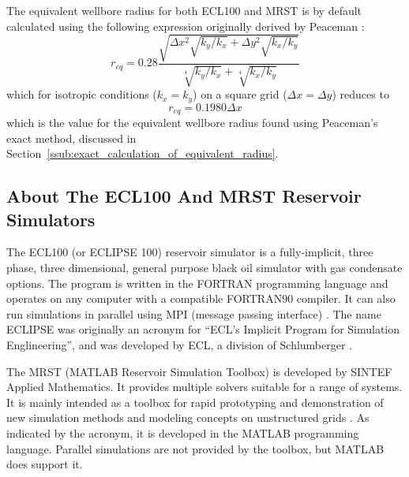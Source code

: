 The equivalent wellbore radius for both ECL100 and MRST is by default calculated using the following expression \cite{Schlumberger2013Eclipse,Lie2014Introduction} originally derived by Peaceman \cite{Peaceman1983Interpretation}:
\begin{equation}
    r_{eq} = 0.28 \frac{\sqrt{\Delta x^2 \sqrt{k_y/k_x} + \Delta y^2 \sqrt{k_x/k_y}}}{\sqrt[4]{k_y/k_x}+\sqrt[4]{k_x/k_y}}
\end{equation}
which for isotropic conditions ($k_x=k_y$) on a square grid ($\Delta x= \Delta y$) reduces to
\begin{equation}
    r_{eq} = 0.1980 \Delta x
\end{equation}
which is the value for the equivalent wellbore radius found using Peaceman's exact method, discussed in Section~\ref{ssub:exact_calculation_of_equivalent_radius}.

\subsection{About The ECL100 And MRST Reservoir Simulators} %
\label{sub:about_the_ecl100_and_mrst_reservoir_simulators}
The ECL100 (or ECLIPSE 100) reservoir simulator is a fully-implicit, three phase, three dimensional, general purpose black oil simulator with gas condensate options. The program is written in the FORTRAN programming language and operates on any computer with a compatible FORTRAN90 compiler. It can also run simulations in parallel using MPI (message passing interface) \cite{Schlumberger2013Eclipse}. The name ECLIPSE was originally an acronym for ``ECL's Implicit Program for Simulation Englineering'', and was developed by ECL, a division of Schlumberger \cite{Wikipedia2014Article}.

The MRST (MATLAB Reservoir Simulation Toolbox) is developed by SINTEF Applied Mathematics. It provides multiple solvers suitable for a range of systems. It is mainly intended as a toolbox for rapid prototyping and demonstration of new simulation methods and modeling concepts on unstructured grids \cite{Sintef2014Sintef}. As indicated by the acronym, it is developed in the MATLAB programming language. Parallel simulations are not provided by the toolbox, but MATLAB does support it.


